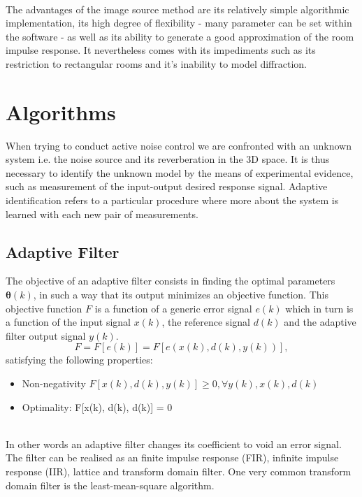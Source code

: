 \\The advantages of the image source method are its relatively simple algorithmic implementation, its high degree of flexibility - many parameter can be set within the software - as well as its ability to generate a good approximation of the room impulse response. It nevertheless comes with its impediments such as its restriction to rectangular rooms and it's inability to model diffraction.\cite{Samarasinghe2018}


\section{Algorithms}
When trying to conduct active noise control we are confronted with an unknown system i.e. the noise source and its reverberation in the 3D space. It is thus necessary to identify the unknown model by the means of experimental evidence, such as measurement of the input-output desired response signal. Adaptive identification refers to a particular procedure where more about the system is learned with each new pair of measurements.\cite{Glentis1999}
\subsection{Adaptive Filter}
The objective of an adaptive filter consists in finding the optimal parameters $\mathbf{\theta}(k)$, in such a way that its output minimizes an objective function. This objective function $F$ is a function of a generic error signal $e(k)$ which in turn is a function of the input signal $x(k)$, the reference signal $d(k)$ and the adaptive filter output signal $y(k)$\cite{Louv1984}. 
\begin{equation}
    F = F[e(k)] = F[e(x(k),d(k),y(k))],
\end{equation}
satisfying the following properties:\\
\begin{itemize}
    \item Non-negativity $F[x(k), d(k), y(k)] \geq 0, \forall y(k), x(k), d(k)$
    \item Optimality: F[x(k), d(k), d(k)] = 0
\end{itemize}
\\
In other words an adaptive filter changes its coefficient to void an error signal. The filter can be realised as an finite impulse response (FIR), infinite impulse response (IIR), lattice and transform domain filter. One  very common transform domain filter is the least-mean-square algorithm.\cite{Thakkar2017}

